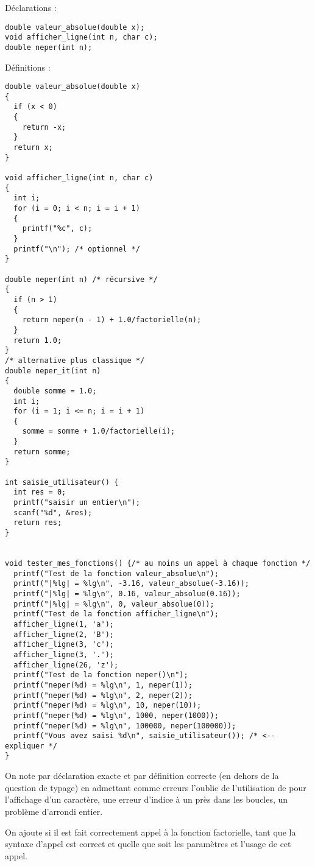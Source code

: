 \begin{correction}
Déclarations :
\begin{verbatim}
double valeur_absolue(double x);
void afficher_ligne(int n, char c);
double neper(int n);
\end{verbatim}

Définitions :
\begin{verbatim}
double valeur_absolue(double x)
{
  if (x < 0)
  {
    return -x;
  }
  return x;
}

void afficher_ligne(int n, char c)
{
  int i;
  for (i = 0; i < n; i = i + 1)
  {
    printf("%c", c);
  }
  printf("\n"); /* optionnel */
}

double neper(int n) /* récursive */
{
  if (n > 1)
  {
    return neper(n - 1) + 1.0/factorielle(n);
  }
  return 1.0;
}
/* alternative plus classique */
double neper_it(int n) 
{
  double somme = 1.0;
  int i;
  for (i = 1; i <= n; i = i + 1)
  {
    somme = somme + 1.0/factorielle(i);
  }
  return somme;
}

int saisie_utilisateur() {
  int res = 0;
  printf("saisir un entier\n");
  scanf("%d", &res);
  return res;
}


void tester_mes_fonctions() {/* au moins un appel à chaque fonction */
  printf("Test de la fonction valeur_absolue\n");
  printf("|%lg| = %lg\n", -3.16, valeur_absolue(-3.16));
  printf("|%lg| = %lg\n", 0.16, valeur_absolue(0.16));
  printf("|%lg| = %lg\n", 0, valeur_absolue(0));
  printf("Test de la fonction afficher_ligne\n");
  afficher_ligne(1, 'a');
  afficher_ligne(2, 'B');
  afficher_ligne(3, 'c');
  afficher_ligne(3, '.');
  afficher_ligne(26, 'z');
  printf("Test de la fonction neper()\n");
  printf("neper(%d) = %lg\n", 1, neper(1));
  printf("neper(%d) = %lg\n", 2, neper(2));
  printf("neper(%d) = %lg\n", 10, neper(10));
  printf("neper(%d) = %lg\n", 1000, neper(1000));
  printf("neper(%d) = %lg\n", 100000, neper(100000));
  printf("Vous avez saisi %d\n", saisie_utilisateur()); /* <-- expliquer */
}
\end{verbatim}

  \begin{baremeenv}
    On note  par déclaration exacte et  par définition
    correcte (en dehors de la question de typage) en admettant comme
    erreurs l'oublie de l'utilisation de  pour l'affichage d'un
    caractère, une erreur d'indice à un près dans les boucles, un
    problème d'arrondi entier.

   On ajoute  si il est fait correctement appel à  la fonction factorielle,
   tant que la syntaxe d'appel est correct et quelle que soit les
   paramètres et l'usage de cet appel.
  \end{baremeenv}
\end{correction}

